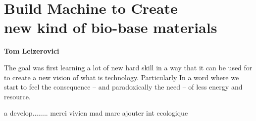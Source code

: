 \chapter*{\centering \Huge Build Machine to Create \\
new kind of bio-base materials }

\begin{center}
    \textbf{Tom Leizerovici} 
\end{center} 
The goal was first learning a lot of new hard skill in a way that it can be used for to create a new vision of what is technology. Particularly In a word where we start to feel the consequence -- and paradoxically the need -- 
of less energy and resource. 

a develop........
merci vivien mad marc
ajouter int ecologique 



\pagebreak

